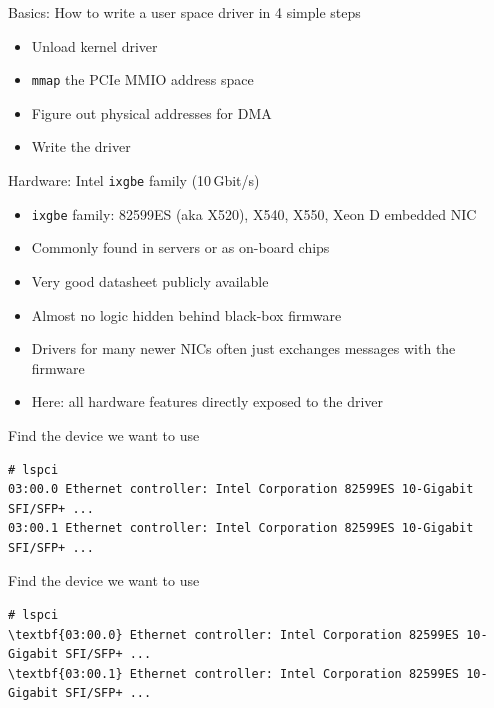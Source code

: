 \documentclass[NET,english,aspectratio=169,notitleframe]{tumbeamer}
\begin{document}
\begin{frame}{Basics: How to write a user space driver in 4 simple steps}
\begin{itemize}
\item[1.] Unload kernel driver
\item[2.] \texttt{mmap} the PCIe MMIO address space
\item[3.] Figure out physical addresses for DMA
\item[4.] Write the driver
\end{itemize}
\end{frame}

\begin{frame}{Hardware: Intel \texttt{ixgbe} family (10\,Gbit/s)}
\begin{itemize}
\item \texttt{ixgbe} family: 82599ES (aka X520), X540, X550, Xeon D embedded NIC
\item Commonly found in servers or as on-board chips
\item Very good datasheet publicly available
\vspace{1em}
\item Almost no logic hidden behind black-box firmware
\item<2-> Drivers for many newer NICs often just exchanges messages with the firmware
\item<2-> Here: all hardware features directly exposed to the driver
\end{itemize}
\end{frame}




\begin{frame}[fragile=singleslide]{Find the device we want to use}
\begin{Verbatim}[commandchars=\\\{\}]
# lspci
03:00.0 Ethernet controller: Intel Corporation 82599ES 10-Gigabit SFI/SFP+ ...
03:00.1 Ethernet controller: Intel Corporation 82599ES 10-Gigabit SFI/SFP+ ...
\end{Verbatim}
\end{frame}

\begin{frame}[fragile=singleslide]{Find the device we want to use}
\begin{Verbatim}[commandchars=\\\{\}]
# lspci
\textbf{03:00.0} Ethernet controller: Intel Corporation 82599ES 10-Gigabit SFI/SFP+ ...
\textbf{03:00.1} Ethernet controller: Intel Corporation 82599ES 10-Gigabit SFI/SFP+ ...
\end{Verbatim}
\end{frame}
\end{document}
